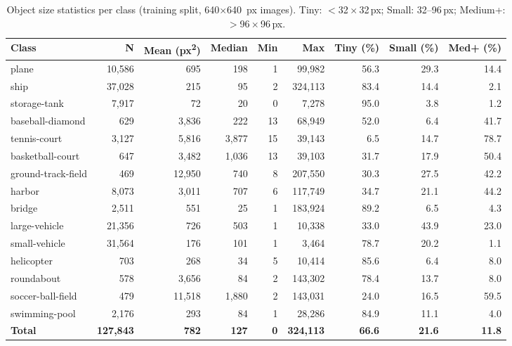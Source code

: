 \begin{table}[htbp]
\centering
\caption{Object size statistics per class (training split, 640$\times$640~px images). Tiny: $<$32\,$\times$\,32\,px; Small: 32--96\,px; Medium+: $>$96\,$\times$\,96\,px.}
\label{tab:dota_yolo_full_sizes}
\begin{tabular}{lrrrrrrrr}
\toprule
\textbf{Class} & \textbf{N} & \textbf{Mean (px\textsuperscript{2})} & \textbf{Median} & \textbf{Min} & \textbf{Max} & \textbf{Tiny (\%)} & \textbf{Small (\%)} & \textbf{Med+ (\%)} \\
\midrule
plane & 10,586 & 695 & 198 & 1 & 99,982 & 56.3 & 29.3 & 14.4 \\
ship & 37,028 & 215 & 95 & 2 & 324,113 & 83.4 & 14.4 & 2.1 \\
storage-tank & 7,917 & 72 & 20 & 0 & 7,278 & 95.0 & 3.8 & 1.2 \\
baseball-diamond & 629 & 3,836 & 222 & 13 & 68,949 & 52.0 & 6.4 & 41.7 \\
tennis-court & 3,127 & 5,816 & 3,877 & 15 & 39,143 & 6.5 & 14.7 & 78.7 \\
basketball-court & 647 & 3,482 & 1,036 & 13 & 39,103 & 31.7 & 17.9 & 50.4 \\
ground-track-field & 469 & 12,950 & 740 & 8 & 207,550 & 30.3 & 27.5 & 42.2 \\
harbor & 8,073 & 3,011 & 707 & 6 & 117,749 & 34.7 & 21.1 & 44.2 \\
bridge & 2,511 & 551 & 25 & 1 & 183,924 & 89.2 & 6.5 & 4.3 \\
large-vehicle & 21,356 & 726 & 503 & 1 & 10,338 & 33.0 & 43.9 & 23.0 \\
small-vehicle & 31,564 & 176 & 101 & 1 & 3,464 & 78.7 & 20.2 & 1.1 \\
helicopter & 703 & 268 & 34 & 5 & 10,414 & 85.6 & 6.4 & 8.0 \\
roundabout & 578 & 3,656 & 84 & 2 & 143,302 & 78.4 & 13.7 & 8.0 \\
soccer-ball-field & 479 & 11,518 & 1,880 & 2 & 143,031 & 24.0 & 16.5 & 59.5 \\
swimming-pool & 2,176 & 293 & 84 & 1 & 28,286 & 84.9 & 11.1 & 4.0 \\
\midrule
\textbf{Total} & \textbf{127,843} & \textbf{782} & \textbf{127} & \textbf{0} & \textbf{324,113} & \textbf{66.6} & \textbf{21.6} & \textbf{11.8} \\
\bottomrule
\end{tabular}
\end{table}
